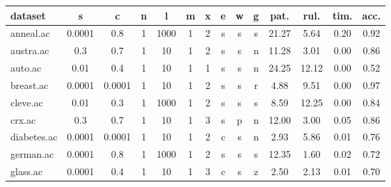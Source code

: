\begin{table}[htbp]
	\centering
		\begin{tabular}{|l|c|c|c|c|c|c|c|c|c||c|c|c|c|}
		\hline
		\textbf{dataset}	& \textbf{s}	& \textbf{c}	& \textbf{n}	& \textbf{l}	& \textbf{m}	& \textbf{x}	& \textbf{e} & \textbf{w} & \textbf{g} & \textbf{pat.}	& \textbf{rul.}	& \textbf{tim.}	& \textbf{acc.}	\\
		\hline
		anneal.ac      & 0.0001   & 0.8         & 1              & 1000                & 1             & 2             & s      & s        & s        & 21.27          & 5.64           & 0.20           & 0.92           \\
		\hline
		austra.ac      & 0.3      & 0.7         & 1              & 10                  & 1             & 2             & s      & s        & n        & 11.28          & 3.01           & 0.00           & 0.86           \\
		\hline
		auto.ac        & 0.01     & 0.4         & 1              & 10                  & 1             & 1             & s      & s        & n        & 24.25          & 12.12          & 0.00           & 0.52           \\
		\hline
		breast.ac      & 0.0001   & 0.0001      & 1              & 10                  & 1             & 2             & s      & s        & r        & 4.88           & 9.51           & 0.00           & 0.97           \\
		\hline
		cleve.ac       & 0.01     & 0.3         & 1              & 1000                & 1             & 2             & s      & s        & s        & 8.59           & 12.25          & 0.00           & 0.84           \\
		\hline
		crx.ac         & 0.3      & 0.7         & 1              & 10                  & 1             & 3             & s      & p        & n        & 12.00          & 3.00           & 0.05           & 0.86           \\
		\hline
		diabetes.ac    & 0.0001   & 0.0001      & 1              & 10                  & 1             & 2             & c      & s        & n        & 2.93           & 5.86           & 0.01           & 0.76           \\
		\hline
		german.ac      & 0.0001   & 0.8         & 1              & 1000                & 1             & 2             & s      & s        & s        & 12.35          & 1.60           & 0.02           & 0.72           \\
		\hline
		glass.ac       & 0.0001   & 0.4         & 1              & 10                  & 1             & 3             & c      & s        & z        & 2.50           & 2.13           & 0.01           & 0.70           \\

\end{tabular}
\end{table}
